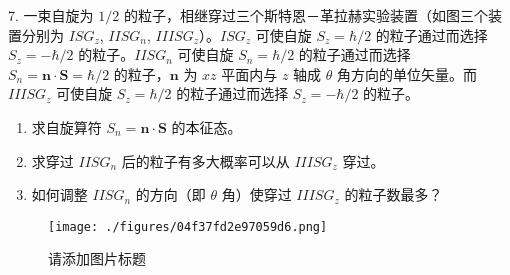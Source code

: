 7. 一束自旋为 $1/2$ 的粒子，相继穿过三个斯特恩－革拉赫实验装置（如图三个装置分别为 $ISG_z$, $IISG_n$, $IIISG_z$）。$ISG_z$ 可使自旋 $S_z = \hbar/2$ 的粒子通过而选择 $S_z = -\hbar/2$ 的粒子。$IISG_n$ 可使自旋 $S_n = \hbar/2$ 的粒子通过而选择 $S_n = \mathbf{n} \cdot \mathbf{S} = \hbar/2$ 的粒子，$\mathbf{n}$ 为 $xz$ 平面内与 $z$ 轴成 $\theta$ 角方向的单位矢量。而 $IIISG_z$ 可使自旋 $S_z = \hbar/2$ 的粒子通过而选择 $S_z = -\hbar/2$ 的粒子。
\begin{enumerate}
\item 求自旋算符 $S_n = \mathbf{n} \cdot \mathbf{S}$ 的本征态。
\item 求穿过 $IISG_n$ 后的粒子有多大概率可以从 $IIISG_z$ 穿过。
\item 如何调整 $IISG_n$ 的方向（即 $\theta$ 角）使穿过 $IIISG_z$ 的粒子数最多？
\end{enumerate}
\begin{figure}[ht]
\centering
\texttt{[image: ./figures/04f37fd2e97059d6.png]}
\caption{请添加图片标题} \label{fig_NJUST2_3}
\end{figure}
